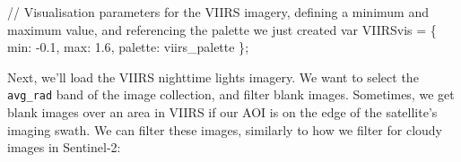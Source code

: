 \documentclass[
  letterpaper,
  DIV=11,
  numbers=noendperiod]{scrreprt}
\newenvironment{Shaded}{\begin{snugshade}}{\end{snugshade}}
\newcommand{\CommentTok}[1]{\textcolor[rgb]{0.37,0.37,0.37}{#1}}
\newcommand{\DataTypeTok}[1]{\textcolor[rgb]{0.68,0.00,0.00}{#1}}
\newcommand{\FloatTok}[1]{\textcolor[rgb]{0.68,0.00,0.00}{#1}}
\newcommand{\KeywordTok}[1]{\textcolor[rgb]{0.00,0.23,0.31}{#1}}
\newcommand{\NormalTok}[1]{\textcolor[rgb]{0.00,0.23,0.31}{#1}}
\newcommand{\OperatorTok}[1]{\textcolor[rgb]{0.37,0.37,0.37}{#1}}
\begin{document}
\begin{Shaded}
\begin{Highlighting}[]
\CommentTok{// Visualisation parameters for the VIIRS imagery, defining a minimum and maximum value, and referencing the palette we just created}
\KeywordTok{var}\NormalTok{ VIIRSvis }\OperatorTok{=}\NormalTok{ \{ }\DataTypeTok{min}\OperatorTok{:} \OperatorTok{{-}}\FloatTok{0.1}\OperatorTok{,} \DataTypeTok{max}\OperatorTok{:} \FloatTok{1.6}\OperatorTok{,} \DataTypeTok{palette}\OperatorTok{:}\NormalTok{ viirs\_palette \}}\OperatorTok{;}
\end{Highlighting}
\end{Shaded}

Next, we'll load the VIIRS nighttime lights imagery. We want to select
the \texttt{avg\_rad} band of the image collection, and filter blank
images. Sometimes, we get blank images over an area in VIIRS if our AOI
is on the edge of the satellite's imaging swath. We can filter these
images, similarly to how we filter for cloudy images in Sentinel-2:
\end{document}
